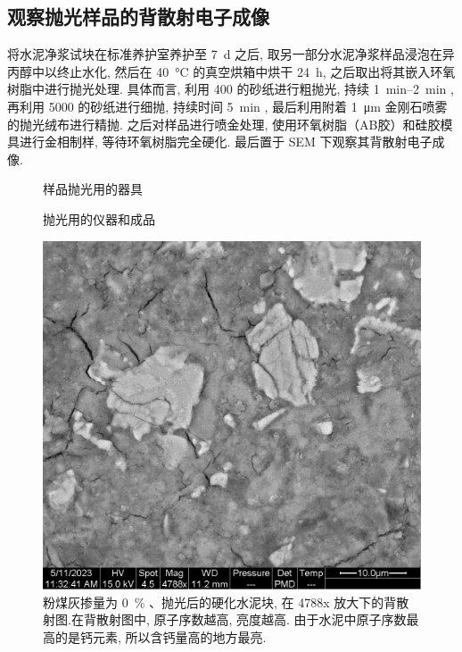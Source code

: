 \subsection{观察抛光样品的背散射电子成像}

将水泥净浆试块在标准养护室养护至 \SI{7}{\day} 之后, 取另一部分水泥净浆样品浸泡在异丙醇中以终止水化, 然后在 \SI{40}{\degreeCelsius} 的真空烘箱中烘干 \SI{24}{\hour}, 之后取出将其嵌入环氧树脂中进行抛光处理. 具体而言, 利用 \SI{400}{} 的砂纸进行粗抛光, 持续 \qtyrange{1}{2}{\minute} , 再利用 \SI{5000}{} 的砂纸进行细抛, 持续时间 \SI{5}{\minute} , 最后利用附着 \SI{1}{\micro\meter} 金刚石喷雾的抛光绒布进行精抛. 
之后对样品进行喷金处理, 使用环氧树脂（AB胶）和硅胶模具进行金相制样, 等待环氧树脂完全硬化. 
最后置于 SEM 下观察其背散射电子成像.


\begin{figure}[!t]
    \centering
     \quad
     \quad
    \caption{样品抛光用的器具}
\end{figure}

\begin{figure}[!t]
    \centering
     \quad
    \caption{抛光用的仪器和成品}
\end{figure}


\begin{figure}
    \centering
    \includegraphics[width = 0.4 \linewidth]{assets/00-polished-04788x-PMD.png}
    \caption{粉煤灰掺量为 \SI{0}{\percent} 、抛光后的硬化水泥块, 在 4788x 放大下的背散射图.在背散射图中, 原子序数越高, 亮度越高. 由于水泥中原子序数最高的是钙元素, 所以含钙量高的地方最亮. }
\end{figure}



